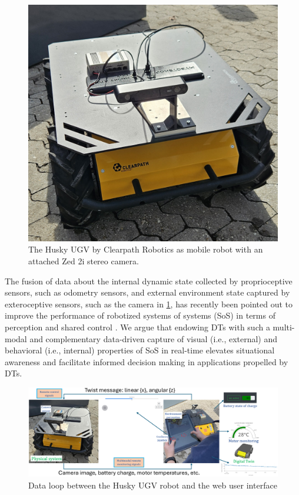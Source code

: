\documentclass[conference]{IEEEtran}
\begin{document}
\begin{figure}[t!]
	\centerline{\includegraphics[width=8.cm]{Pictures/huskyzed2.jpg}}
	\caption{The Husky UGV by Clearpath Robotics as mobile robot with an attached Zed 2i stereo camera.}
	\label{fig:huskyClearpath}
\end{figure} 

The fusion of data  about the internal dynamic state collected by proprioceptive sensors, such as  odometry sensors, and external environment state captured by exteroceptive sensors, such as the camera in \cref{fig:huskyClearpath}, has  recently been pointed out to improve the performance of robotized systems of systems (SoS) in terms of perception and shared control \cite{chen2023enabling,kaigom}. We argue that endowing DTs with such a multi-modal and complementary  data-driven capture of visual (i.e., external) and behavioral (i.e., internal)  properties of SoS in real-time elevates situational awareness and facilitate informed decision making in applications  propelled by DTs. %

\begin{figure}[t]
	\centerline{\includegraphics[width=16.35cm]{Pictures/loop.png}}
	\caption{Data loop between the Husky UGV robot and the web user interface}
	\label{fig:loop}
\end{figure}
 
\end{document}
